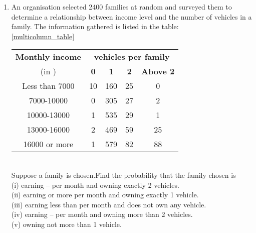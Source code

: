 \renewcommand{\theequation}{\theenumi}
\begin{enumerate}[label=\arabic*.,ref=\thesubsection.\theenumi]
\item An organisation selected 2400 families at random and surveyed them to determine a relationship between income level and the number of vehicles in a family. The information gathered is listed in the table:\\
\ref{multicolumn_table}
\begin{table}[!ht]
	\begin{tabular}{|c|c|c|c|c|}
		\hline
		\textbf{Monthly income} &\multicolumn{4}{c|}{\textbf{vehicles per family }}\\
		\cline{2-5}
		(in \textbf{\rupee}) &\textbf{0} &\textbf{1} &\textbf{2} &\textbf{Above 2}\\
		\hline
		Less than 7000 &10 &160 &25 &0\\
		\hline
		7000-10000 &0 &305 &27 &2\\
		\hline
		10000-13000 &1 &535 &29 &1\\
		\hline
		13000-16000 &2 &469 &59 &25\\
		\hline
		16000 or more  &1 &579 &82 &88 \\
		\hline
	\end{tabular}
\end{table}\\
Suppose a family is chosen.Find the probability that the family chosen is\\
(i) earning  –  per month and owning exactly 2 vehicles.\\
(ii) earning  or more per month and owning exactly 1 vehicle.\\
(iii) earning less than  per month and does not own any vehicle.\\
(iv) earning  –  per month and owning more than 2 vehicles.\\
(v) owning not more than 1 vehicle.
\end{enumerate}